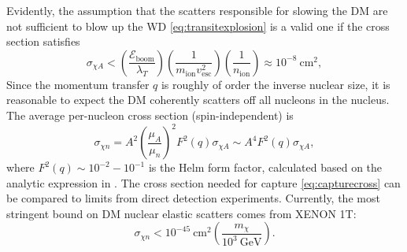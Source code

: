 \documentclass[preprintnumbers,amsmath,amssymb,prd,superscriptaddress]{revtex4}
\newcommand{\Eboom}{\mathcal{E}_\text{boom}}
\newcommand{\GeV}{\text{GeV}}
\newcommand{\cm}{\text{cm}}
\def\r{\right)}
\def\l{\left(}
\begin{document}
Evidently, the assumption that the scatters responsible for slowing the DM are not sufficient to blow up the WD \eqref{eq:transitexplosion} is a valid one if the cross section satisfies
\begin{equation}
\sigma_{\chi A} < \l \frac{\Eboom}{\lambda_T} \r \l \frac{1}{m_\text{ion} v_\text{esc}^2} \r \l \frac{1}{n_\text{ion}} \r \approx 10^{-8} ~\cm^2,
\end{equation}
Since the momentum transfer $q$ is roughly of order the inverse nuclear size, it is reasonable to expect the DM coherently scatters off all nucleons in the nucleus. 
The average per-nucleon cross section (spin-independent) is
\begin{equation}
\sigma_{\chi n} = A^2 \l \frac{\mu_{A}}{\mu_{n}}\r^2 F^2(q) \sigma_{\chi A} \sim A^4 F^2(q) \sigma_{\chi A},
\end{equation}
where $F^2(q) \sim 10^{-2}-10^{-1}$ is the Helm form factor, calculated based on the analytic expression in \cite{LUX thesis}. 
The cross section needed for capture \eqref{eq:capturecross} can be compared to limits from direct detection experiments.
Currently, the most stringent bound on DM nuclear elastic scatters comes from XENON 1T:
\begin{equation}
\label{eq:xenon}
\sigma_{\chi n} < 10^{-45} ~\text{cm}^2 \l \frac{m_\chi}{10^3 ~\GeV} \r.
\end{equation}
\end{document}
